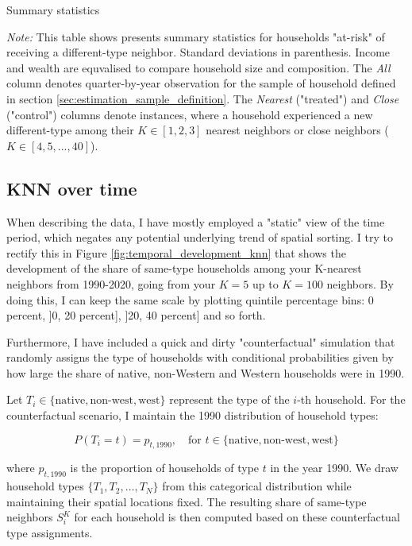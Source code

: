 \documentclass[main.tex]{subfiles}
\begin{document}
\begin{table}[H]
    \centering
    \caption{Summary statistics}
    \resizebox{\textwidth}{!}{}
    \label{tab:descriptives_native_and_non_west}
\begin{tablenotes}[flushleft]
\item \scriptsize \textit{Note:} This table shows presents summary statistics for households "at-risk" of receiving a different-type neighbor. Standard deviations in parenthesis. Income and wealth are equvalised to compare household size and composition. The \textit{All} column denotes quarter-by-year observation for the sample of household defined in section \ref{sec:estimation_sample_definition}. The \textit{Nearest} ("treated") and \textit{Close} ("control") columns denote instances, where a household experienced a new different-type among their $K\in [1,2,3]$ nearest neighbors or close neighbors ($K\in [4, 5, ...,40]$).
\end{tablenotes}
\end{table}

\subsection{KNN over time}
When describing the data, I have mostly employed a "static" view of the time period, which negates any potential underlying trend of spatial sorting. I try to rectify this in Figure \ref{fig:temporal_development_knn} that shows the development of the share of same-type households among your K-nearest neighbors from 1990-2020, going from your $K=5$ up to $K=100$ neighbors. By doing this, I can keep the same scale by plotting quintile percentage bins: 0 percent, ]0, 20 percent], ]20, 40 percent] and so forth. 

Furthermore, I have included a quick and dirty "counterfactual" simulation that randomly assigns the type of households with conditional probabilities given by how large the share of native, non-Western and Western households were in 1990.

Let $T_i \in \{\text{native}, \text{non-west}, \text{west}\}$ represent the type of the $i$-th household. For the counterfactual scenario, I maintain the 1990 distribution of household types:

$$P(T_i = t) = p_{t,1990}, \quad \text{for } t \in \{\text{native}, \text{non-west}, \text{west}\}$$

where $p_{t,1990}$ is the proportion of households of type $t$ in the year 1990. We draw household types $\{T_1, T_2, \ldots, T_N\}$ from this categorical distribution while maintaining their spatial locations fixed. The resulting share of same-type neighbors $S_i^K$ for each household is then computed based on these counterfactual type assignments.
\end{document}
